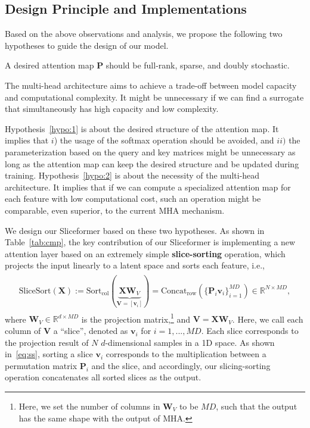 \subsection{Design Principle and Implementations}
Based on the above observations and analysis, we propose the following two hypotheses to guide the design of our model. 
\begin{hypothesis}\label{hypo:1}
A desired attention map $\bm{P}$ should be full-rank, sparse, and doubly stochastic.
\end{hypothesis}
\begin{hypothesis}\label{hypo:2}
The multi-head architecture aims to achieve a trade-off between model capacity and computational complexity. 
It might be unnecessary if we can find a surrogate that simultaneously has high capacity and low complexity.
\end{hypothesis}
Hypothesis~\ref{hypo:1} is about the desired structure of the attention map. 
It implies that $i$) the usage of the softmax operation should be avoided, and $ii)$ the parameterization based on the query and key matrices might be unnecessary as long as the attention map can keep the desired structure and be updated during training. 
Hypothesis~\ref{hypo:2} is about the necessity of the multi-head architecture. 
It implies that if we can compute a specialized attention map for each feature with low computational cost, such an operation might be comparable, even superior, to the current MHA mechanism.


We design our Sliceformer based on these two hypotheses. 
As shown in Table~\ref{tab:cmp}, the key contribution of our Sliceformer is implementing a new attention layer based on an extremely simple \textbf{slice-sorting} operation, which projects the input linearly to a latent space and sorts each feature, i.e.,
\begin{eqnarray}\label{eq:ss}
\begin{aligned}
    \text{SliceSort}(\bm{X}) := \text{Sort}_{\text{col}}(\underbrace{\bm{X}\bm{W}_V}_{\bm{V}=[\bm{v}_i]}) = \text{Concat}_{\text{row}}(\{\bm{P}_i\bm{v}_i\}_{i=1}^{MD}) \in\mathbb{R}^{N\times MD},
\end{aligned}
\end{eqnarray}
where $\bm{W}_V\in\mathbb{R}^{d\times MD}$ is the projection matrix,\footnote{Here, we set the number of columns in $\bm{W}_V$ to be $MD$, such that the output has the same shape with the output of MHA.} and $\bm{V}=\bm{XW}_V$. 
Here, we call each column of $\bm{V}$ a ``slice'', denoted as $\bm{v}_i$ for $i=1,...,MD$. 
Each slice corresponds to the projection result of $N$ $d$-dimensional samples in a 1D space. 
As shown in~\eqref{eq:ss}, sorting a slice $\bm{v}_i$ corresponds to the multiplication between a permutation matrix $\bm{P}_i$ and the slice, and accordingly, our slicing-sorting operation concatenates all sorted slices as the output. 

